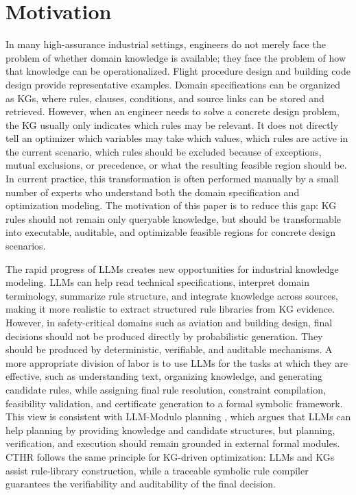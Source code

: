 ﻿\documentclass[a4paper,fleqn]{cas-dc}
\newcommand{\CTHR}{\textsc{CTHR}}
\begin{document}
\section{Motivation}
\label{sec:motivation}

In many high-assurance industrial settings, engineers do not merely face the
problem of whether domain knowledge is available; they face the problem of how
that knowledge can be operationalized. Flight procedure design and building
code design provide representative examples. Domain specifications can be
organized as KGs, where rules, clauses, conditions, and source links can be
stored and retrieved. However, when an engineer needs to solve a concrete
design problem, the KG usually only indicates which rules may be relevant. It
does not directly tell an optimizer which variables may take which values,
which rules are active in the current scenario, which rules should be excluded
because of exceptions, mutual exclusions, or precedence, or what the resulting
feasible region should be. In current practice, this transformation is often
performed manually by a small number of experts who understand both the domain
specification and optimization modeling. The motivation of this paper is to
reduce this gap: KG rules should not remain only queryable knowledge, but
should be transformable into executable, auditable, and optimizable feasible
regions for concrete design scenarios.

The rapid progress of LLMs creates new opportunities for industrial knowledge
modeling. LLMs can help read technical specifications, interpret domain
terminology, summarize rule structure, and integrate knowledge across sources,
making it more realistic to extract structured rule libraries from KG evidence.
However, in safety-critical domains such as aviation and building design, final
decisions should not be produced directly by probabilistic generation. They
should be produced by deterministic, verifiable, and auditable mechanisms. A
more appropriate division of labor is to use LLMs for the tasks at which they
are effective, such as understanding text, organizing knowledge, and generating
candidate rules, while assigning final rule resolution, constraint compilation,
feasibility validation, and certificate generation to a formal symbolic
framework. This view is consistent with LLM-Modulo planning
\cite{kambhampati2024llmmodulo}, which argues that LLMs can help planning by
providing knowledge and candidate structures, but planning, verification, and
execution should remain grounded in external formal modules. \CTHR{} follows
the same principle for KG-driven optimization: LLMs and KGs assist rule-library
construction, while a traceable symbolic rule compiler guarantees the
verifiability and auditability of the final decision.
\end{document}
